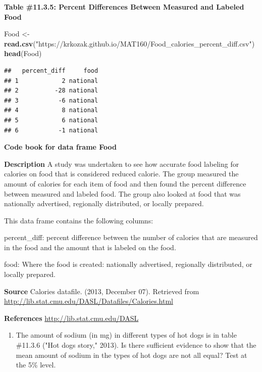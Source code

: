 \documentclass[
]{book}
\newenvironment{Shaded}{\begin{snugshade}}{\end{snugshade}}
\newcommand{\KeywordTok}[1]{\textcolor[rgb]{0.13,0.29,0.53}{\textbf{#1}}}
\newcommand{\NormalTok}[1]{#1}
\newcommand{\StringTok}[1]{\textcolor[rgb]{0.31,0.60,0.02}{#1}}
\providecommand{\tightlist}{%
  \setlength{\itemsep}{0pt}\setlength{\parskip}{0pt}}
\begin{document}
\textbf{Table \#11.3.5: Percent Differences Between Measured and Labeled Food}

\begin{Shaded}
\begin{Highlighting}[]
\NormalTok{Food <-}\StringTok{ }\KeywordTok{read.csv}\NormalTok{(}\StringTok{"https://krkozak.github.io/MAT160/Food_calories_percent_diff.csv"}\NormalTok{)}
\KeywordTok{head}\NormalTok{(Food)}
\end{Highlighting}
\end{Shaded}

\begin{verbatim}
##   percent_diff     food
## 1            2 national
## 2          -28 national
## 3           -6 national
## 4            8 national
## 5            6 national
## 6           -1 national
\end{verbatim}

\textbf{Code book for data frame Food}

\textbf{Description}
A study was undertaken to see how accurate food labeling for calories on food that is considered reduced calorie. The group measured the amount of calories for each item of food and then found the percent difference between measured and labeled food. The group also looked at food that was nationally advertised, regionally distributed, or locally prepared.

This data frame contains the following columns:

percent\_diff: percent difference between the number of calories that are measured in the food and the amount that is labeled on the food.

food: Where the food is created: nationally advertised, regionally distributed, or locally prepared.

\textbf{Source}
Calories datafile. (2013, December 07). Retrieved from \url{http://lib.stat.cmu.edu/DASL/Datafiles/Calories.html}

\textbf{References}
\url{http://lib.stat.cmu.edu/DASL}

\begin{enumerate}
\def\labelenumi{\arabic{enumi}.}
\setcounter{enumi}{4}
\tightlist
\item
  The amount of sodium (in mg) in different types of hot dogs is in table \#11.3.6 ("Hot dogs story," 2013). Is there sufficient evidence to show that the mean amount of sodium in the types of hot dogs are not all equal? Test at the 5\% level.
\end{enumerate}
\end{document}
